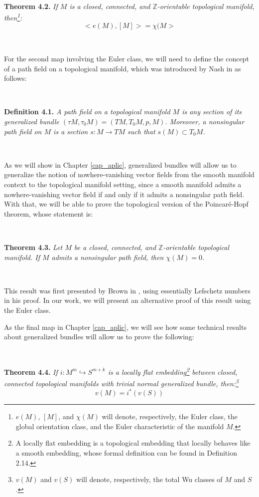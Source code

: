 \documentclass[12pt,oneside]{book}
\newcommand{\Z}{\mathbb{Z}}
\begin{document}
    \

    \textbf{Theorem 4.2. }\textit{If $M$ is a closed, connected, and $\Z$-orientable topological 
    manifold, then\footnote{$e(M)$, $[M]$, and $\chi(M)$ will denote, respectively, the Euler class, 
    the global orientation class, and the Euler characteristic of the manifold $M$.}:
    $$ <e(M),[M]>=\chi(M> $$}

    \

    For the second map involving the Euler class, we will need to define the concept of a path field on 
    a topological manifold, which was introduced by Nash in \cite{nash} as follows:
    
    \

    \textbf{Definition 4.1. }\textit{A path field on a topological manifold $M$ is any section of its 
    generalized bundle $(\tau M,\tau_{0}M)=(TM,T_{0}M,p,M)$. Moreover, a nonsingular path field on $M$ 
    is a section $s:M\to TM$ such that $s(M)\subset T_{0}M$.}

    \

    As we will show in Chapter \ref{cap_aplic}, generalized bundles will allow us to generalize the 
    notion of nowhere-vanishing vector fields from the smooth manifold context to the topological 
    manifold setting, since a smooth manifold admits a nowhere-vanishing vector field if and only if it 
    admits a nonsingular path field. With that, we will be able to prove the topological version of the 
    Poincaré-Hopf theorem, whose statement is:

    \

    \textbf{Theorem 4.3. }\textit{Let $M$ be a closed, connected, and $\Z$-orientable topological 
    manifold. If $M$ admits a nonsingular path field, then $\chi(M)=0$.}

    \

    This result was first presented by Brown in \cite{brown}, using essentially Lefschetz numbers in his 
    proof. In our work, we will present an alternative proof of this result using the Euler class.

    As the final map in Chapter \ref{cap_aplic}, we will see how some technical results about generalized 
    bundles will allow us to prove the following:

    \
    
    \textbf{Theorem 4.4. }\textit{If $i:M^{m}\hookrightarrow S^{m+k}$ is a locally flat 
    embedding\footnote{A locally flat embedding is a topological embedding that locally behaves like a 
    smooth embedding, whose formal definition can be found in Definition 2.14.} between closed, 
    connected topological manifolds with trivial normal generalized bundle, then:\footnote{$v(M)$ and 
    $v(S)$ will denote, respectively, the total Wu classes of $M$ and $S$.}
    $$v(M)=i^{*}(v(S))$$}
\end{document}
